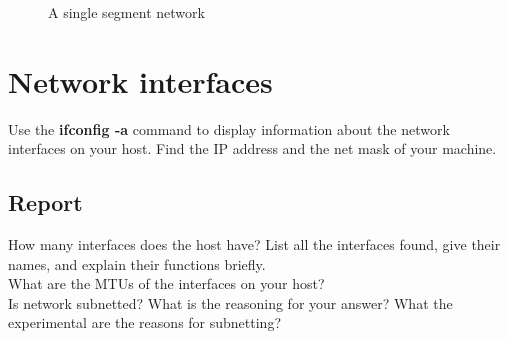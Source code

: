 \documentclass{../UTNetLab}
\begin{document}
\begin{center}
\begin{minipage}{0.48\textwidth}
\begin{flushright}
                \begin{figure}[H]
                    \centering
                    \caption{A single segment network}        
                \end{figure}
            \end{flushright}
        \end{minipage}
    \end{center}

\section{Network interfaces}
    Use the \textbf{ifconfig -a} command to display information about the network interfaces on your host.
    Find the IP address and the net mask of your machine.
    \subsection*{Report}

    How many interfaces does the host have?
    List all the interfaces found, give their names, and explain their functions briefly. \\
    What are the MTUs of the interfaces on your host? \\
    Is network subnetted?
    What is the reasoning for your answer? What the experimental are the reasons for subnetting?
\end{document}
